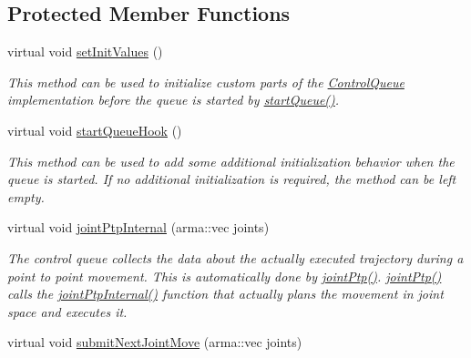 \subsection*{Protected Member Functions}
\begin{DoxyCompactItemize}
\item 
\hypertarget{classkukadu_1_1KukieControlQueue_ab828e3291b59e05855efd323a0124ac4}{virtual void \hyperlink{classkukadu_1_1KukieControlQueue_ab828e3291b59e05855efd323a0124ac4}{set\-Init\-Values} ()}\label{classkukadu_1_1KukieControlQueue_ab828e3291b59e05855efd323a0124ac4}

\begin{DoxyCompactList}\small\item\em This method can be used to initialize custom parts of the \hyperlink{classkukadu_1_1ControlQueue}{Control\-Queue} implementation before the queue is started by \hyperlink{classkukadu_1_1ControlQueue_a35d6a6e4e7c8467691c11567fe21f340}{start\-Queue()}. \end{DoxyCompactList}\item 
\hypertarget{classkukadu_1_1KukieControlQueue_ab86936efc30e3b3584fdaf98ef006540}{virtual void \hyperlink{classkukadu_1_1KukieControlQueue_ab86936efc30e3b3584fdaf98ef006540}{start\-Queue\-Hook} ()}\label{classkukadu_1_1KukieControlQueue_ab86936efc30e3b3584fdaf98ef006540}

\begin{DoxyCompactList}\small\item\em This method can be used to add some additional initialization behavior when the queue is started. If no additional initialization is required, the method can be left empty. \end{DoxyCompactList}\item 
\hypertarget{classkukadu_1_1KukieControlQueue_a73687ba516b2cfb5f9124ae9f165fc57}{virtual void \hyperlink{classkukadu_1_1KukieControlQueue_a73687ba516b2cfb5f9124ae9f165fc57}{joint\-Ptp\-Internal} (arma\-::vec joints)}\label{classkukadu_1_1KukieControlQueue_a73687ba516b2cfb5f9124ae9f165fc57}

\begin{DoxyCompactList}\small\item\em The control queue collects the data about the actually executed trajectory during a point to point movement. This is automatically done by \hyperlink{classkukadu_1_1ControlQueue_ad11059100321b24a1af8ef7de8314353}{joint\-Ptp()}. \hyperlink{classkukadu_1_1ControlQueue_ad11059100321b24a1af8ef7de8314353}{joint\-Ptp()} calls the \hyperlink{classkukadu_1_1KukieControlQueue_a73687ba516b2cfb5f9124ae9f165fc57}{joint\-Ptp\-Internal()} function that actually plans the movement in joint space and executes it. \end{DoxyCompactList}\item 
\hypertarget{classkukadu_1_1KukieControlQueue_a801f4d00e4eed9c11a53cb1521db42f0}{virtual void \hyperlink{classkukadu_1_1KukieControlQueue_a801f4d00e4eed9c11a53cb1521db42f0}{submit\-Next\-Joint\-Move} (arma\-::vec joints)}\label{classkukadu_1_1KukieControlQueue_a801f4d00e4eed9c11a53cb1521db42f0}


\end{DoxyCompactItemize}
